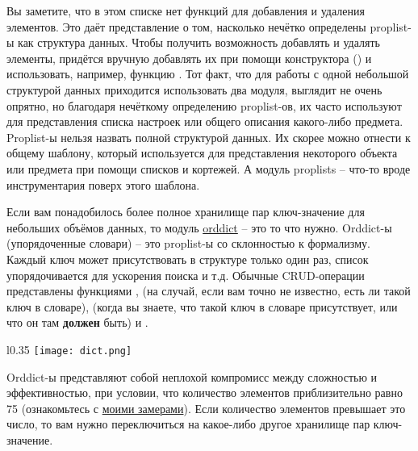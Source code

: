 Вы заметите, что в этом списке нет функций для добавления и удаления элементов.
Это даёт представление о том, насколько нечётко определены proplist\--ы как структура данных.
Чтобы получить возможность добавлять и удалять элементы, придётся вручную добавлять их при помощи конструктора () и использовать, например, функцию .
Тот факт, что для работы с одной небольшой структурой данных приходится использовать два модуля, выглядит не очень опрятно, но благодаря нечёткому определению proplist\--ов, их часто используют для представления списка настроек или общего описания какого\--либо предмета.
Proplist\--ы нельзя назвать полной структурой данных.
Их скорее можно отнести к общему шаблону, который используется для представления некоторого объекта или предмета при помощи списков и кортежей.
А модуль proplists \--- что\--то вроде инструментария поверх этого шаблона.

Если вам понадобилось более полное хранилище пар ключ\--значение для небольших объёмов данных, то модуль \href{http://erldocs.com/R15B/stdlib/orddict.html}{orddict} \--- это то что нужно.
Orddict\--ы (упорядоченные словари) \--- это proplist\--ы со склонностью к формализму.
Каждый ключ может присутствовать в структуре только один раз, список упорядочивается для ускорения поиска и т.д.
Обычные CRUD\--операции представлены функциями ,  (на случай, если вам точно не известно, есть ли такой ключ в словаре),  (когда вы знаете, что такой ключ в словаре присутствует, или что он там \textbf{должен} быть) и .
\begin{wrapfigure}{l}{0.35\linewidth}
    \texttt{[image: dict.png]}
\end{wrapfigure}

Orddict\--ы представляют собой неплохой компромисс между сложностью и эффективностью, при условии, что количество элементов приблизительно равно 75 (ознакомьтесь с \href{http://learnyousomeerlang.com/static/erlang/keyval\_benchmark.erl}{моими замерами}).
Если количество элементов превышает это число, то вам нужно переключиться на какое\--либо другое хранилище пар ключ\--значение.

